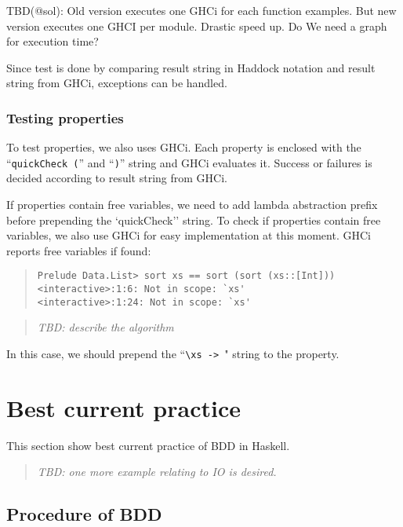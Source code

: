\documentclass[preprint]{sigplanconf}
\begin{document}
TBD(@sol): Old version executes one GHCi for each function examples.
But new version executes one GHCI per module.
Drastic speed up. Do We need a graph for execution time?

Since test is done by comparing result string in Haddock notation
and result string from GHCi, exceptions can be handled.

\subsubsection{Testing properties}

To test properties, we also uses GHCi.
Each property is enclosed with
the ``\verb|quickCheck (|'' and ``\verb|)|'' string
and GHCi evaluates it.
Success or failures is decided according to result string from GHCi.

If properties contain free variables,
we need to add lambda abstraction prefix before prepending
the `quickCheck'' string.
To check if properties contain free variables,
we also use GHCi for easy implementation at this moment.
GHCi reports free variables if found:

\begin{quote}
\small
\begin{verbatim}
Prelude Data.List> sort xs == sort (sort (xs::[Int]))
<interactive>:1:6: Not in scope: `xs'
<interactive>:1:24: Not in scope: `xs'
\end{verbatim}
\end{quote}

\begin{quote}
    \emph{TBD: describe the algorithm}
\end{quote}


\noindent In this case, we should prepend the ``\verb|\xs -> |" string
to the property.


\section{Best current practice}
\label{ref:Best-current-practice}

This section show best current practice of
BDD in Haskell.

\begin{quote}
    \emph{TBD: one more example relating to IO is desired.}
\end{quote}

\subsection{Procedure of BDD}
\end{document}
